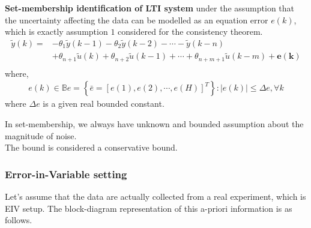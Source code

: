 \textbf{Set-membership identification of LTI system} under the assumption that the uncertainty affecting the data can be modelled as an equation error \(e(k)\), which is exactly assumption \(1\) considered for the consistency theorem.\\
\[
\begin{aligned}
\tilde{y}(k) = & -\theta_1 \tilde{y}(k - 1) - \theta_2 \tilde{y}(k - 2) - \cdots - \tilde{y}(k - n) \\[1ex]
               & + \theta_{n+1} \tilde{u}(k) + \theta_{n+2} \tilde{u}(k - 1) + \cdots + \theta_{n+m+1} \tilde{u}(k - m) + \mathbf{e(k)} \\[2ex]
\end{aligned}
\]
where,
\[
\begin{aligned}
e(k) \in \mathbb{B}e = \left\{ \bar{e} = [e(1), e(2), \cdots, e(H)]^T \right\} : \left| e(k) \right| \leq \Delta e, \forall k
\end{aligned}
\]
where  \(\Delta e \) is a given real bounded constant.

\begin{factbox}[]
In set-membership, we always have unknown and bounded assumption about the magnitude of noise.\\

The bound is considered a conservative bound.

\end{factbox}
\subsubsection{Error-in-Variable setting}
Let's assume that the data are actually collected from a real experiment, which is EIV setup. The block-diagram representation of this a-priori information is as follows.

